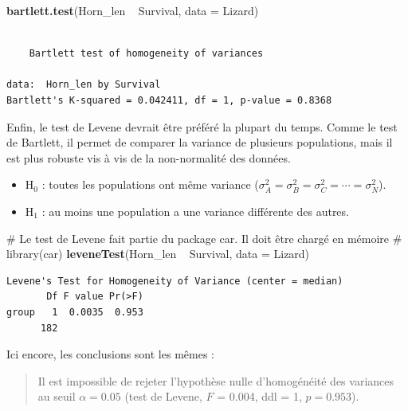 \documentclass[a4paperpaper,]{article}
\newenvironment{Shaded}{\begin{snugshade}}{\end{snugshade}}
\newcommand{\CommentTok}[1]{\textcolor[rgb]{0.54,0.53,0.53}{#1}}
\newcommand{\DataTypeTok}[1]{\textcolor[rgb]{0.00,0.34,0.68}{#1}}
\newcommand{\KeywordTok}[1]{\textcolor[rgb]{0.12,0.11,0.11}{\textbf{#1}}}
\newcommand{\NormalTok}[1]{\textcolor[rgb]{0.12,0.11,0.11}{#1}}
\newcommand{\OperatorTok}[1]{\textcolor[rgb]{0.12,0.11,0.11}{#1}}
\newcommand{\StringTok}[1]{\textcolor[rgb]{0.75,0.01,0.01}{#1}}
\providecommand{\tightlist}{%
  \setlength{\itemsep}{0pt}\setlength{\parskip}{0pt}}
\begin{document}
\begin{Shaded}
\begin{Highlighting}[]
\KeywordTok{bartlett.test}\NormalTok{(Horn_len }\OperatorTok{~}\StringTok{ }\NormalTok{Survival, }\DataTypeTok{data =}\NormalTok{ Lizard)}
\end{Highlighting}
\end{Shaded}

\begin{verbatim}

    Bartlett test of homogeneity of variances

data:  Horn_len by Survival
Bartlett's K-squared = 0.042411, df = 1, p-value = 0.8368
\end{verbatim}

Enfin, le test de Levene devrait être préféré la plupart du temps. Comme le test de Bartlett, il permet de comparer la variance de plusieurs populations, mais il est plus robuste vis à vis de la non-normalité des données.

\begin{itemize}
\tightlist
\item
  H\(_0\) : toutes les populations ont même variance (\(\sigma^2_A = \sigma^2_B = \sigma^2_C = \cdots = \sigma^2_N\)).
\item
  H\(_1\) : au moins une population a une variance différente des autres.
\end{itemize}

\begin{Shaded}
\begin{Highlighting}[]
\CommentTok{# Le test de Levene fait partie du package car. Il doit être chargé en mémoire}
\CommentTok{# library(car)}
\KeywordTok{leveneTest}\NormalTok{(Horn_len }\OperatorTok{~}\StringTok{ }\NormalTok{Survival, }\DataTypeTok{data =}\NormalTok{ Lizard)}
\end{Highlighting}
\end{Shaded}

\begin{verbatim}
Levene's Test for Homogeneity of Variance (center = median)
       Df F value Pr(>F)
group   1  0.0035  0.953
      182               
\end{verbatim}

Ici encore, les conclusions sont les mêmes :

\begin{quote}
Il est impossible de rejeter l'hypothèse nulle d'homogénéité des variances au seuil \(\alpha = 0.05\) (test de Levene, \(F\) = 0.004, ddl = 1, \(p = 0.953\)).
\end{quote}
\end{document}
